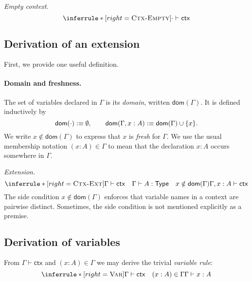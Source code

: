 \documentclass{article}
\newcommand{\Type}{\ensuremath{\mathsf{Type}}}
\newcommand{\defeq}{\vcentcolon\equiv}
\newcommand{\Nat}{\mathsf{Nat}}
\newcommand{\Bool}{\mathsf{Bool}}
\newcommand{\String}{\mathsf{String}}
\newcommand{\emptyctx}{\cdot}              %
\newcommand{\ctx}{\mathsf{ctx}}            %
\newcommand{\judg}[3]{#1 \vdash #2 : #3}   %
\newcommand{\dom}{\mathsf{dom}}            %
\newcommand{\rulename}[1]{\textsc{#1}}
\begin{document}
\medskip
\noindent
\emph{Empty context.}
\[
\inferrule*[right=\rulename{Ctx-Empty}]{
}{
\emptyctx \vdash \ctx
}
\]

\subsection*{Derivation of an extension}
First, we provide one useful definition.

\paragraph{Domain and freshness.}
The set of variables declared in \(\Gamma\) is its \emph{domain}, written
\(\dom(\Gamma)\). It is defined inductively by
\[
\dom(\emptyctx) \defeq \emptyset,
\qquad
\dom(\Gamma, x:A) \defeq \dom(\Gamma) \cup \{x\}.
\]
We write \(x \notin \dom(\Gamma)\) to express that \(x\) is \emph{fresh} for \(\Gamma\).
We use the usual membership notation \((x:A)\in\Gamma\) to mean that the
declaration \(x:A\) occurs somewhere in \(\Gamma\).

\medskip
\noindent
\emph{Extension.}
\[
\inferrule*[right=\rulename{Ctx-Ext}]{
\Gamma \vdash \ctx
\quad
\judg{\Gamma}{A}{\Type}
\quad
x \notin \dom(\Gamma)
}{
\Gamma, x:A \vdash \ctx
}
\]
The side condition \(x \notin \dom(\Gamma)\) enforces that variable names in a context are pairwise distinct. Sometimes, the side condition is not mentioned explicitly as a premise.

\subsection*{Derivation of variables}
From \(\Gamma \vdash \ctx\) and \((x:A)\in\Gamma\) we may derive the trivial
\emph{variable rule}:
\[
\inferrule*[right=\rulename{Var}]{
\Gamma \vdash \ctx
\quad
(x:A)\in\Gamma
}{
\judg{\Gamma}{x}{A}
}
\]




\end{document}
